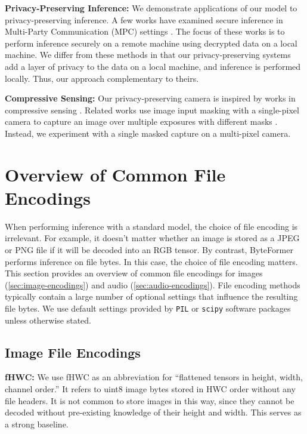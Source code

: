 \textbf{Privacy-Preserving Inference:} We demonstrate applications of our model to privacy-preserving inference. A few works have examined secure inference in Multi-Party Communication (MPC) settings \cite{securenn,cryptflow,cryptflow2,secure-featurization,orca}. The focus of these works is to perform inference securely on a remote machine using decrypted data on a local machine. We differ from these methods in that our privacy-preserving systems add a layer of privacy to the data on a local machine, and inference is performed locally. Thus, our approach complementary to theirs.

\textbf{Compressive Sensing:} Our privacy-preserving camera is inspired by works in compressive sensing \cite{compressive-sensing}. Related works use image input masking with a single-pixel camera to capture an image over multiple exposures with different masks \cite{single-pixel-imaging,deep-learning-single-pixel}. Instead, we experiment with a single masked capture on a multi-pixel camera.

\section{Overview of Common File Encodings} \label{sec:background}
When performing inference with a standard model, the choice of file encoding is irrelevant. For example, it doesn't matter whether an image is stored as a JPEG or PNG file if it will be decoded into an RGB tensor. By contrast, ByteFormer performs inference on file bytes. In this case, the choice of file encoding matters. This section provides an overview of  common file encodings for images (\autoref{sec:image-encodings}) and audio (\autoref{sec:audio-encodings}). File encoding methods typically contain a large number of optional settings that influence the resulting file bytes. We use default settings provided by {\tt PIL} \cite{pil} or {\tt scipy} \cite{scipy} software packages unless otherwise stated.

\subsection{Image File Encodings} \label{sec:image-encodings}
\textbf{fHWC:} We use fHWC as an abbreviation for ``flattened tensors in height, width, channel order.'' It refers to uint8 image bytes stored in HWC order without any file headers. It is not common to store images in this way, since they cannot be decoded without pre-existing knowledge of their height and width. This serves as a strong baseline.

